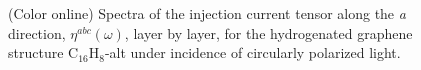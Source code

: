 \documentclass[pss]{wiley2sp} %
\begin{document}
\begin{figure}[t]
  \centering
  \\
  \\
  \caption{(Color online) Spectra of the injection current tensor along the \emph{a} direction, {$\eta^{abc}(\omega)$}, layer by layer, for the hydrogenated graphene structure C$_{16}$H$_{8}$-alt under incidence of circularly polarized light.\label{fig:alt-eta}}
\end{figure}
\end{document}
